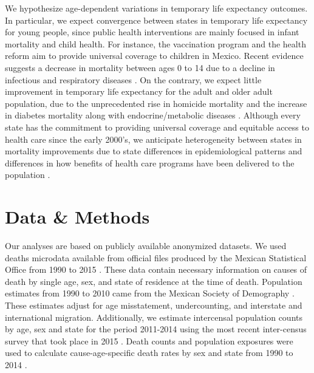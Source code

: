 \documentclass{article}
\begin{document}
\begin{spacing}{1.5}
We hypothesize age-dependent variations in temporary life expectancy outcomes.
In particular, we expect convergence between states in temporary life expectancy
for young people, since public health interventions are mainly focused in infant
mortality and child health. For instance, the vaccination program and the health
reform aim to provide universal coverage to children in Mexico. Recent
evidence suggests a decrease in mortality between ages 0 to 14 due to a decline
in infectious and respiratory diseases \citep{canudas2014}. On the contrary, we
expect little improvement in temporary life expectancy for the adult and older
adult population, due to the unprecedented rise in homicide mortality and the
increase in diabetes mortality along with endocrine/metabolic diseases \citep{canudas2014}. Although every
state has the commitment to providing universal coverage and equitable access to
health care since the early 2000's, we anticipate heterogeneity between states
in mortality improvements due to state differences in epidemiological patterns
and differences in how benefits of health care programs have been delivered to
the population \citep{Frenk2006}.


\section*{Data \& Methods} 
Our analyses are based on publicly available anonymized datasets.%
We used deaths microdata available from official files produced by
the Mexican Statistical Office from 1990 to 2015 \citep{INEGI}. These data
contain necessary information on causes of death by single age, sex, and state
of residence at the time of death. Population estimates from 1990 to
2010 came from the Mexican Society of Demography \citep{SOMEDE}. These
estimates adjust for age misstatement, undercounting, and interstate
and international migration. Additionally, we estimate intercensal population
counts by age, sex and state for the period 2011-2014 using the most recent
inter-census survey that took place in 2015 \citep{INEGI}. Death counts and
population exposures were used to calculate cause-age-specific death rates by
sex and state from 1990 to 2014 \citep{SOMEDE}.


\end{spacing}
\end{document}
